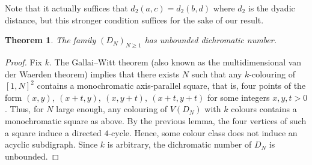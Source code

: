 \documentclass{amsart}
\newtheorem{theorem}{Theorem}
\begin{document}
Note that it actually suffices that $d_2(a,c) = d_2(b,d)$ where $d_2$ is the dyadic distance, but this stronger condition suffices for the sake of our result.

\begin{theorem}
The family $(D_N)_{N\ge 1}$ has unbounded dichromatic number.
\end{theorem}

\begin{proof}
Fix $k$. The Gallai--Witt theorem  \cite{W51} (also known as the multidimensional van der Waerden theorem) implies that there exists $N$ such that any $k$-colouring of $[1,N]^2$ contains a monochromatic axis-parallel square, that is, four points of the form $(x,y),\ (x+t,y),\ (x,y+t),\ (x+t,y+t)$ for some integers $x,y,t>0$. Thus, for $N$ large enough, any colouring of $V(D_N)$ with $k$ colours contains a monochromatic square as above. By the previous lemma, the four vertices of such a square induce a directed $4$-cycle. Hence, some colour class does not induce an acyclic subdigraph. Since $k$ is arbitrary, the dichromatic number of $D_N$ is unbounded.
\end{proof}




\end{document}

